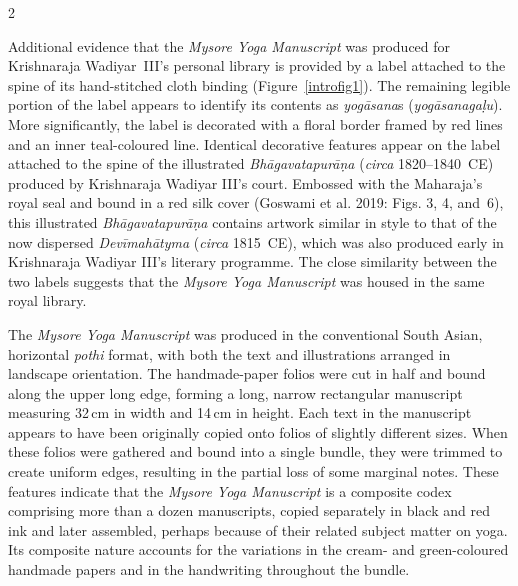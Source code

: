 \begin{nohyp}
\begin{multicols*}{2}
\begin{eng}
Additional evidence that the \emph{Mysore Yoga Manuscript} was produced for Krishnaraja Wadiyar~III's personal library is provided by a label attached to the spine of its hand-stitched cloth binding (Figure~\ref{introfig1}). The remaining legible portion of the label appears to identify its contents as \emph{yogāsana}s (\emph{yogāsanagaḷu}). More significantly, the label is decorated with a floral border framed by red lines and an inner teal-coloured line. Identical decorative features appear on the label attached to the spine of the illustrated \emph{Bhāgavatapurāṇa} (\emph{circa} 1820--1840~CE) produced by Krishnaraja Wadiyar III's court. Embossed with the Maharaja's royal seal and bound in a red silk cover (Goswami et al. 2019: Figs. 3, 4, and~6), this illustrated \emph{Bhāgavatapurāṇa} contains artwork similar in style to that of the now dispersed \emph{Devīmahātyma} (\emph{circa} 1815~CE), which was also produced early in Krishnaraja Wadiyar III's literary programme. The close similarity between the two labels suggests that the \emph{Mysore Yoga Manuscript} was housed in the same royal library.
\columnbreak



\label{introsec1.2}
\vskip 9pt

\noindent
The \emph{Mysore Yoga Manuscript} was produced in the conventional South Asian, horizontal \emph{pothi} format, with both the text and illustrations arranged in landscape orientation. The handmade-paper folios were cut in half and bound along the upper long edge, forming a long, narrow rectangular manuscript measuring 32\,cm in width and 14\,cm in height. Each text in the manuscript appears to have been originally copied onto folios of slightly different sizes. When these folios were gathered and bound into a single bundle, they were trimmed to create uniform edges, resulting in the partial loss of some marginal notes. These features indicate that the \emph{Mysore Yoga Manuscript} is a composite codex comprising more than a dozen manuscripts, copied separately in black and red ink and later assembled, perhaps because of their related subject matter on yoga. Its composite nature accounts for the variations in the cream- and green-coloured handmade papers and in the handwriting throughout the bundle.


\end{eng}
\end{multicols*}
\end{nohyp}
